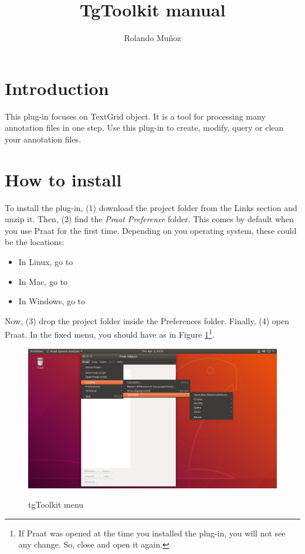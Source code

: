 \documentclass[10pt,a4paper]{article}
\author{Rolando Muñoz}
\title{TgToolkit manual}
\begin{document}
\maketitle

\section{Introduction}
This plug-in focuses on TextGrid object. It is a tool for processing many annotation files in one step. Use this plug-in to create, modify, query or clean your annotation files.

\section{How to install}
To install the plug-in, (1) download the project folder from the Links section and unzip it. Then, (2) find the \textit{Praat Preference} folder. This comes by default when you use Praat for the first time. Depending on you operating system, these could be the locations:

\begin{itemize}
	\item In Linux, go to 
	\item In Mac, go to 
	\item In Windows, go to 
\end{itemize}

Now, (3) drop the project folder inside the Preferences folder. Finally, (4) open Praat. In the fixed menu, you should have  as in Figure \ref{fig:tgToolkit_menu}\footnote{If Praat was opened at the time you installed the plug-in, you will not see any change. So, close and open it again.}.

\begin{figure}[H]
	\centering
	\includegraphics[scale=0.3]{img/tg_toolkit-menu}
	\label{fig:tgToolkit_menu}
	\caption{tgToolkit menu}
\end{figure}
\end{document}
